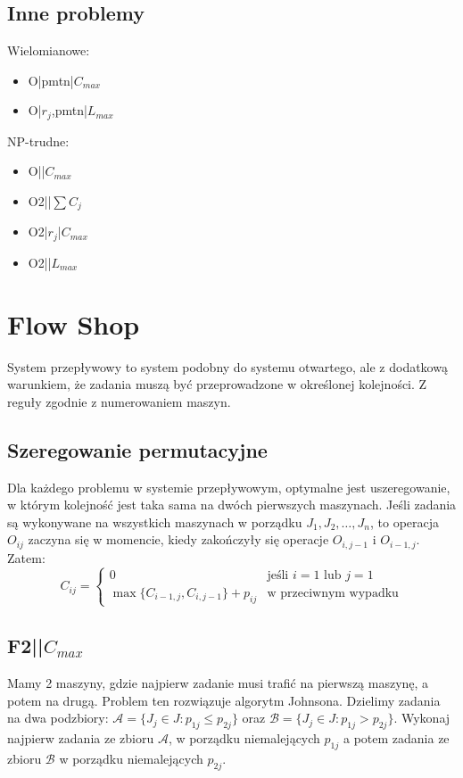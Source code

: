 \documentclass{../notatki}
\begin{document}
\subsection{Inne problemy}

Wielomianowe:
\begin{itemize}
  \item O|pmtn|$C_{max}$
  \item O|$r_j$,pmtn|$L_{max}$
\end{itemize}
NP-trudne:
\begin{itemize}
  \item O||$C_{max}$
  \item O2||$\sum C_j$
  \item O2|$r_j$|$C_{max}$
  \item O2||$L_{max}$
\end{itemize}

\section{Flow Shop}

System przepływowy to system podobny do systemu otwartego, ale z dodatkową
warunkiem, że zadania muszą być przeprowadzone w określonej kolejności.
Z reguły zgodnie z numerowaniem maszyn.

\subsection{Szeregowanie permutacyjne}

Dla każdego problemu w systemie przepływowym, optymalne jest
uszeregowanie, w którym kolejność jest taka sama na dwóch pierwszych maszynach.
Jeśli zadania są wykonywane na wszystkich maszynach w porządku $J_1,
J_2, \ldots, J_n$, to operacja $O_{ij}$ zaczyna się w momencie, kiedy zakończyły
się operacje $O_{i,j-1}$ i $O_{i-1,j}$. Zatem:
$$
C_{ij} =
\begin{cases}
  0 & \text{jeśli } i = 1 \text{ lub } j = 1 \\
  \max\{C_{i-1,j}, C_{i,j-1}\} + p_{ij} & \text{w przeciwnym wypadku}
\end{cases}
$$

\subsection{F2||\texorpdfstring{$C_{max}$}{Cmax}}

Mamy 2 maszyny, gdzie najpierw zadanie musi trafić na pierwszą maszynę,
a potem na drugą. Problem ten rozwiązuje algorytm Johnsona. Dzielimy
zadania na dwa podzbiory: $\mathcal{A} = \{J_j \in J : p_{1j} \le p_{2j}\}$
oraz $\mathcal{B} =\{J_j \in J: p_{1j} > p_{2j}\}$. Wykonaj najpierw zadania
ze zbioru $\mathcal{A}$, w porządku niemalejących $p_{1j}$ a potem
zadania ze zbioru $\mathcal{B}$ w porządku niemalejących $p_{2j}$.
\end{document}
